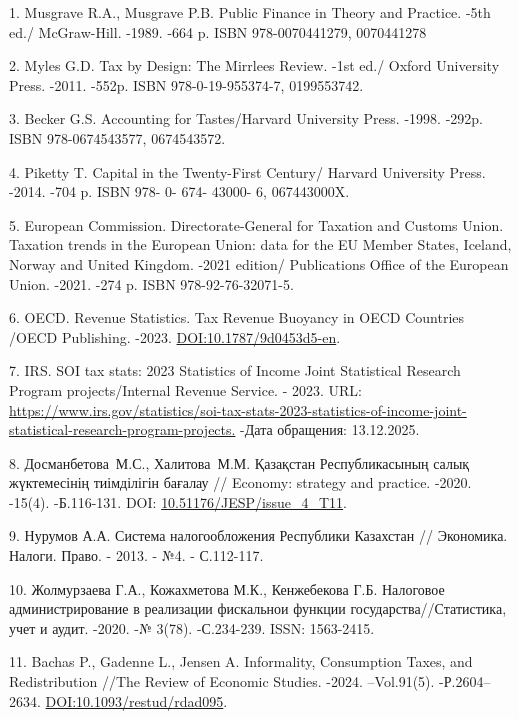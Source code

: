 \begin{refs}
1. Musgrave R.A., Musgrave P.B. Public Finance in Theory and Practice.
-5th ed./ McGraw-Hill. -1989. -664 p. ISBN 978-0070441279, 0070441278

2. Myles G.D. Tax by Design: The Mirrlees Review. -1st ed./ Oxford
University Press. -2011. -552p. ISBN 978-0-19-955374-7, 0199553742.

3. Becker G.S. Accounting for Tastes/Harvard University Press. -1998.
-292p. ISBN 978-0674543577, 0674543572.

4. Piketty T. Capital in the Twenty-First Century/ Harvard University
Press. -2014. -704 p. ISBN 978- 0- 674- 43000- 6, 067443000X.

5. European Commission. Directorate-General for Taxation and Customs
Union. Taxation trends in the European Union: data for the EU Member
States, Iceland, Norway and United Kingdom. -2021 edition/
Publications Office of the European Union. -2021. -274 p. ISBN
978-92-76-32071-5.

6. OECD. Revenue Statistics. Tax Revenue Buoyancy in OECD Countries /OECD
Publishing. -2023.
\href{https://doi.org/10.1787/9d0453d5-en}{DOI:10.1787/9d0453d5-en}.

7. IRS. SOI tax stats: 2023 Statistics of Income Joint Statistical
Research Program projects/Internal Revenue Service. - 2023. URL:
\href{https://www.irs.gov/statistics/soi-tax-stats-2023-statistics-of-income-joint-statistical-research-program-projects.\%20}{https://www.irs.gov/statistics/soi-tax-stats-2023-statistics-of-income-joint-statistical-research-program-projects.}
-Дата обращения: 13.12.2025.

8. Досманбетова~М.С., Халитова~М.М. Қазақстан Республикасының салық
жүктемесінің тиімділігін бағалау // Economy: strategy and practice.
-2020. -15(4). -Б.116-131. DOI:
\href{https://doi.org/10.51176/JESP/issue_4_T11}{10.51176/JESP/issue\_4\_T11}.

9. Нурумов А.А. Система налогообложения Республики Казахстан //
Экономика. Налоги. Право. - 2013. - №4. - С.112-117.

10. Жолмурзаева Г.А., Кожахметова М.К., Кенжебекова Г.Б. Налоговое
администрирование в реализации фискальнои функции
государства//Статистика, учет и аудит. -2020. -№ 3(78). -С.234-239.
ISSN: 1563-2415.

11. Bachas P., Gadenne L., Jensen A. Informality, Consumption Taxes, and
Redistribution //The Review of Economic Studies. -2024. --Vol.91(5).
-Р.2604--2634.
\href{https://doi.org/10.1093/restud/rdad095}{DOI:10.1093/restud/rdad095}.


\end{refs}
